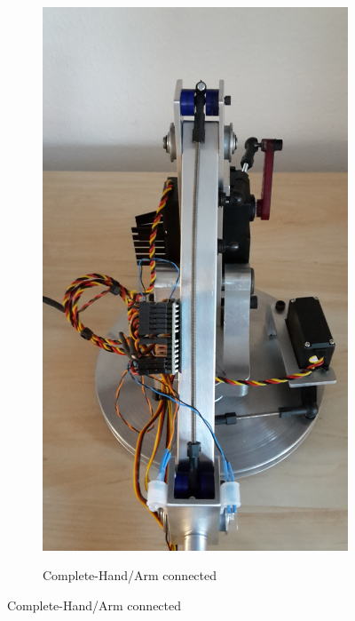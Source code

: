 \documentclass[progress]{cmpreport}
\begin{document}
\begin{figure} [H]
\begin{subfigure}[h]{0.4\linewidth}
		\includegraphics[trim=20cm 0cm 22cm 0cm, clip=true, totalheight=0.29\textheight, angle=-90]{photos/Day36-pt1.jpg}
	\end{subfigure}%
	\hfill
	\begin{subfigure}[h]{0.4\linewidth}
		\caption{Complete-Hand/Arm connected}

\end{subfigure}
\end{figure}
\end{document}
